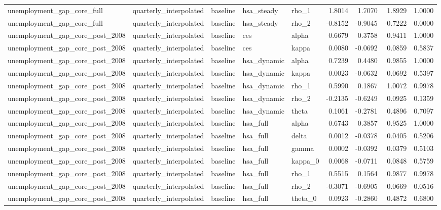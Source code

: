 \begin{tabular}{lllllrrrr}
unemployment\_gap\_core\_full & quarterly\_interpolated & baseline & hsa\_steady & rho\_1 & 1.8014 & 1.7070 & 1.8929 & 1.0000 \\
unemployment\_gap\_core\_full & quarterly\_interpolated & baseline & hsa\_steady & rho\_2 & -0.8152 & -0.9045 & -0.7222 & 0.0000 \\
unemployment\_gap\_core\_post\_2008 & quarterly\_interpolated & baseline & ces & alpha & 0.6679 & 0.3758 & 0.9411 & 1.0000 \\
unemployment\_gap\_core\_post\_2008 & quarterly\_interpolated & baseline & ces & kappa & 0.0080 & -0.0692 & 0.0859 & 0.5837 \\
unemployment\_gap\_core\_post\_2008 & quarterly\_interpolated & baseline & hsa\_dynamic & alpha & 0.7239 & 0.4480 & 0.9855 & 1.0000 \\
unemployment\_gap\_core\_post\_2008 & quarterly\_interpolated & baseline & hsa\_dynamic & kappa & 0.0023 & -0.0632 & 0.0692 & 0.5397 \\
unemployment\_gap\_core\_post\_2008 & quarterly\_interpolated & baseline & hsa\_dynamic & rho\_1 & 0.5990 & 0.1867 & 1.0072 & 0.9978 \\
unemployment\_gap\_core\_post\_2008 & quarterly\_interpolated & baseline & hsa\_dynamic & rho\_2 & -0.2135 & -0.6249 & 0.0925 & 0.1359 \\
unemployment\_gap\_core\_post\_2008 & quarterly\_interpolated & baseline & hsa\_dynamic & theta & 0.1061 & -0.2781 & 0.4896 & 0.7097 \\
unemployment\_gap\_core\_post\_2008 & quarterly\_interpolated & baseline & hsa\_full & alpha & 0.6743 & 0.3857 & 0.9525 & 1.0000 \\
unemployment\_gap\_core\_post\_2008 & quarterly\_interpolated & baseline & hsa\_full & delta & 0.0012 & -0.0378 & 0.0405 & 0.5206 \\
unemployment\_gap\_core\_post\_2008 & quarterly\_interpolated & baseline & hsa\_full & gamma & 0.0002 & -0.0392 & 0.0379 & 0.5103 \\
unemployment\_gap\_core\_post\_2008 & quarterly\_interpolated & baseline & hsa\_full & kappa\_0 & 0.0068 & -0.0711 & 0.0848 & 0.5759 \\
unemployment\_gap\_core\_post\_2008 & quarterly\_interpolated & baseline & hsa\_full & rho\_1 & 0.5515 & 0.1564 & 0.9877 & 0.9978 \\
unemployment\_gap\_core\_post\_2008 & quarterly\_interpolated & baseline & hsa\_full & rho\_2 & -0.3071 & -0.6905 & 0.0669 & 0.0516 \\
unemployment\_gap\_core\_post\_2008 & quarterly\_interpolated & baseline & hsa\_full & theta\_0 & 0.0923 & -0.2860 & 0.4872 & 0.6800 \\

\end{tabular}
